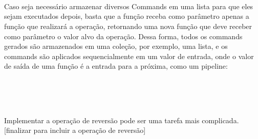 \begin{lstlisting}[caption={Command Funcional},label=fpcommand]
    

    
\end{lstlisting}

Caso seja necessário armazenar diversos Commands em uma 
lista para que eles sejam executados depois, basta que 
a função receba como parâmetro apenas a função que 
realizará a operação, retornando uma nova função que 
deve receber como parâmetro o valor alvo da operação. 
Dessa forma, todos os commands gerados são armazenados em 
uma coleção, por exemplo, uma lista, e os commands 
são aplicados sequencialmente em um valor de entrada, 
onde o valor de saída de uma função é a entrada para a 
próxima, como um pipeline:

\begin{lstlisting}[caption={Coleção de Commands Funcional},label=fpcommands]
    

    
\end{lstlisting}

Implementar a operação de reversão pode ser uma tarefa 
mais complicada. [finalizar para incluir a operação de 
reversão]

\begin{lstlisting}[caption={Command Reversível},label=fprecommand]
    

    
\end{lstlisting}